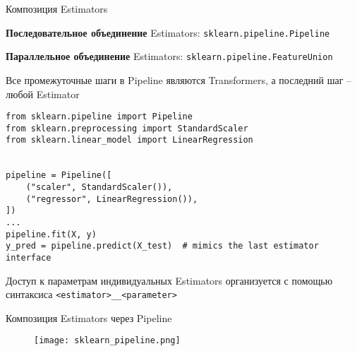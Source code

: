 \documentclass{beamer}
\begin{document}
\begin{frame}[fragile]{Композиция Estimators}
    \scriptsize

    \textbf{Последовательное объединение} Estimators: \texttt{sklearn.pipeline.Pipeline}

    \textbf{Параллельное объединение} Estimators: \texttt{sklearn.pipeline.FeatureUnion}

    \vspace{10pt}
    Все промежуточные шаги в Pipeline являются Transformers, а последний шаг -- любой Estimator

    \begin{lstlisting}
from sklearn.pipeline import Pipeline
from sklearn.preprocessing import StandardScaler
from sklearn.linear_model import LinearRegression


pipeline = Pipeline([
    ("scaler", StandardScaler()),
    ("regressor", LinearRegression()),
])
...
pipeline.fit(X, y)
y_pred = pipeline.predict(X_test)  # mimics the last estimator interface\end{lstlisting}

    Доступ к параметрам индивидуальных Estimators организуется с помощью синтаксиса \texttt{<estimator>\_\_<parameter>}
\end{frame}

\begin{frame}[fragile]{Композиция Estimators через Pipeline}
    \scriptsize

    \begin{figure}
        \texttt{[image: sklearn\_pipeline.png]}
    \end{figure}
\end{frame}
\end{document}
